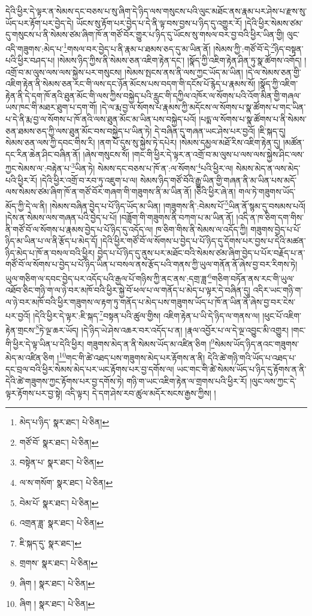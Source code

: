 དེའི་ཕྱིར་དེ་ལྟར་ན་སེམས་དང་བཅས་པ་སུ་ཞིག་དེ་ཉིད་ལས་གསུངས་པའི་ལུང་མཐོང་ནས་རྣམ་པར་ཤེས་པ་རྫས་སུ་ཡོད་པར་རྟོག་པར་བྱེད་དེ། ཡོངས་སུ་རྟོག་པར་བྱེད་པ་དེ་ནི་ལྟ་བས་བྱས་པ་ཉིད་དུ་འགྱུར་རོ། །དེའི་ཕྱིར་སེམས་ཙམ་དུ་གསུངས་པ་ནི་སེམས་ཙམ་ཞིག་ཁོ་ན་གཙོ་བོར་གྱུར་པ་ཉིད་དུ་ཡོངས་སུ་གསལ་བར་བྱ་བའི་ཕྱིར་ཡིན་གྱི། ལུང་འདི་གཟུགས་:མེད་པ་\footnote{མེད་པ་ཉིད་  སྣར་ཐང་།  པེ་ཅིན། }གསལ་བར་བྱེད་པ་ནི་རྣམ་པ་ཐམས་ཅད་དུ་མ་ཡིན་ནོ། །སེམས་ཀྱི་:གཙོ་བོ་དེ་\footnote{གཙོ་བོ་  སྣར་ཐང་།  པེ་ཅིན། }ཉིད་བསྟན་པའི་ཕྱིར་བཤད་པ། །སེམས་ཉིད་ཀྱིས་ནི་སེམས་ཅན་འཇིག་རྟེན་དང་། །སྣོད་ཀྱི་འཇིག་རྟེན་ཤིན་ཏུ་སྣ་ཚོགས་འགོད། །འགྲོ་བ་མ་ལུས་ལས་ལས་སྐྱེས་པར་གསུངས། །སེམས་སྤངས་ནས་ནི་ལས་ཀྱང་ཡོད་མ་ཡིན། །དེ་ལ་སེམས་ཅན་གྱི་འཇིག་རྟེན་ནི་སེམས་ཅན་རང་གི་ལས་དང་ཉོན་མོངས་པས་བདག་གི་དངོས་པོ་རྙེད་པ་རྣམས་སོ། །སྣོད་ཀྱི་འཇིག་རྟེན་ནི་དེ་དག་ཁོ་ནའི་ཐུན་མོང་གི་ལས་ཀྱིས་བསྐྱེད་པའི་རླུང་གི་དཀྱིལ་འཁོར་ལ་སོགས་པའི་འོག་མིན་གྱི་གཞལ་ཡས་ཁང་གི་མཐར་ཐུག་པ་དག་གོ། །དེ་ལ་རྨ་བྱ་ལ་སོགས་པ་རྣམས་ཀྱི་མདོངས་ལ་སོགས་པ་སྣ་ཚོགས་པ་གང་ཡིན་པ་དེ་ནི་རྨ་བྱ་ལ་སོགས་པ་ཁོ་ནའི་ལས་ཐུན་མོང་མ་ཡིན་པས་བསྐྱེད་པའོ། །པདྨ་ལ་སོགས་པ་སྣ་ཚོགས་པ་ནི་སེམས་ཅན་ཐམས་ཅད་ཀྱི་ལས་ཐུན་མོང་བས་བསྐྱེད་པ་ཡིན་ཏེ། དེ་བཞིན་དུ་གཞན་ཡང་ཤེས་པར་བྱའོ། །ཇི་སྐད་དུ། སེམས་ཅན་ལས་ཀྱི་དབང་གིས་རི། །ནག་པོ་དུས་སུ་སྐྱེས་ཏེ་དཔེར། །སེམས་དམྱལ་མཐོ་རིས་འཇིག་རྟེན་དུ། །མཚོན་དང་རིན་ཆེན་ཤིང་བཞིན་ནོ། །ཞེས་གསུངས་སོ། །གང་གི་ཕྱིར་དེ་ལྟར་ན་འགྲོ་བ་མ་ལུས་པ་ལས་ལས་སྐྱེས་ཤིང་ལས་ཀྱང་སེམས་ལ་:བརྟེན་པ་\footnote{བསྟེན་པ་  སྣར་ཐང་།  པེ་ཅིན། }ཡིན་ཏེ། སེམས་དང་བཅས་པ་ཁོ་ན་:ལ་སོགས་\footnote{ལ་ས་གསོག་  སྣར་ཐང་།  པེ་ཅིན། }པའི་ཕྱིར་ལ། སེམས་མེད་ན་ལས་མེད་པའི་ཕྱིར་རོ། །དེའི་ཕྱིར་འགྲོ་བ་རབ་ཏུ་འཇུག་པ་ལ། སེམས་ཉིད་གཙོ་བོའི་རྒྱུ་ཡིན་གྱི་གཞན་ནི་མ་ཡིན་པས་མདོ་ལས་སེམས་ཙམ་ཞིག་ཁོ་ན་གཙོ་བོར་གཞག་གི་གཟུགས་ནི་མ་ཡིན་ནོ། །ཅིའི་ཕྱིར་ཞེ་ན། གལ་ཏེ་གཟུགས་ཡོད་མོད་ཀྱི་དེ་ལ་ནི། །སེམས་བཞིན་བྱེད་པ་པོ་ཉིད་ཡོད་མ་ཡིན། །གཟུགས་ནི་:བེམས་པོ་\footnote{བེམ་པོ་  སྣར་ཐང་།  པེ་ཅིན། }ཡིན་ནོ་སྙམ་དུ་བསམས་པའོ། །དེས་ན་སེམས་ལས་གཞན་པའི་བྱེད་པ་པོ། །བཟློག་གི་གཟུགས་ནི་བཀག་པ་མ་ཡིན་ནོ། །འདི་ན་ཁ་ཅིག་དག་གིས་ནི་གཙོ་བོ་ལ་སོགས་པ་རྣམས་བྱེད་པ་པོ་ཉིད་དུ་འདོད་ལ། ཁ་ཅིག་གིས་ནི་སེམས་ལ་འདོད་ཀྱི། གཟུགས་བྱེད་པ་པོ་ཉིད་མ་ཡིན་པ་ལ་ནི་རྩོད་པ་མེད་དོ། །དེའི་ཕྱིར་གཙོ་བོ་ལ་སོགས་པ་བྱེད་པ་པོ་ཉིད་དུ་དོགས་པར་བྱས་པ་དེའི་མཚན་ཉིད་མེད་པ་ཁོ་ན་བསལ་བའི་ཕྱིར། བྱེད་པ་པོ་ཉིད་དུ་ནུས་པར་མཐོང་བའི་སེམས་ཙམ་ཞིག་བྱེད་པ་པོར་བརྗོད་པ་ན་གཙོ་བོ་ལ་སོགས་པ་བྱེད་པ་པོ་ཉིད་ཡིན་པ་བསལ་ནས་རྩོད་པའི་གནས་ཀྱི་ཡུལ་གནོན་ནོ་ཞེས་བྱ་བར་རིགས་ཏེ། ཡུལ་གཅིག་ལ་དབང་བྱེད་པར་འདོད་པའི་རྒྱལ་པོ་གཉིས་ཀྱི་ནང་ནས་:དགྲ་ཟླ་\footnote{འགྲན་ཟླ་  སྣར་ཐང་།  པེ་ཅིན། }གཅིག་བཏོན་ནས་རང་གི་ཡུལ་འཐོབ་ཅིང་གཉི་ག་ལ་ཉེ་བར་མཁོ་བའི་ཕྱིར་སྐྱེ་བོ་ཕལ་པ་ལ་གནོད་པ་མེད་པ་ལྟར་དེ་བཞིན་དུ། འདིར་ཡང་གཉི་ག་ལ་ཉེ་བར་མཁོ་བའི་ཕྱིར་གཟུགས་ལ་རྟག་ཏུ་གནོད་པ་མེད་པས་གཟུགས་ཡོད་པ་ཁོ་ན་ཡིན་ནོ་ཞེས་བྱ་བར་ངེས་པར་བྱའོ། །དེའི་ཕྱིར་དེ་ལྟར་:ཇི་སྐད་\footnote{ཇི་སྐད་དུ་  སྣར་ཐང་། }བསྟན་པའི་ཚུལ་གྱིས། འཇིག་རྟེན་པ་ཡི་དེ་ཉིད་ལ་གནས་ལ། །ཕུང་པོ་འཇིག་རྟེན་གྲངས་\footnote{གྲགས་  སྣར་ཐང་།  པེ་ཅིན། }ཏེ་ལྔ་ཆར་ཡོད། །དེ་ཉིད་ཡེ་ཤེས་འཆར་བར་འདོད་པ་ན། །རྣལ་འབྱོར་པ་ལ་དེ་ལྔ་འབྱུང་མི་འགྱུར། །གང་གི་ཕྱིར་དེ་ལྟ་ཡིན་པ་དེའི་ཕྱིར། གཟུགས་མེད་ན་ནི་སེམས་ཡོད་མ་འཛིན་ཅིག །\footnote{ཞིག །  སྣར་ཐང་།  པེ་ཅིན། }སེམས་ཡོད་ཉིད་ནའང་གཟུགས་མེད་མ་འཛིན་ཅིག །\footnote{ཞིག །  སྣར་ཐང་།  པེ་ཅིན། }གང་གི་ཚེ་འཐད་པས་གཟུགས་མེད་པར་རྟོགས་ན་ནི། དེའི་ཚེ་གཉི་གའི་ཡོད་པ་འཐད་པ་དང་བྲལ་བའི་ཕྱིར་སེམས་མེད་པར་ཡང་རྟོགས་པར་བྱ་དགོས་ལ། ཡང་གང་གི་ཚེ་སེམས་ཡོད་པ་ཉིད་དུ་རྟོགས་ན་ནི་དེའི་ཚེ་གཟུགས་ཀྱང་རྟོགས་པར་བྱ་དགོས་ཏེ། གཉི་ག་ཡང་འཇིག་རྟེན་ལ་གྲགས་པའི་ཕྱིར་རོ། །ལུང་ལས་ཀྱང་དེ་ལྟར་རྟོགས་པར་བྱ་སྟེ། འདི་ལྟར། དེ་དག་ཤེས་རབ་ཚུལ་མདོར་སངས་རྒྱས་ཀྱིས། །
